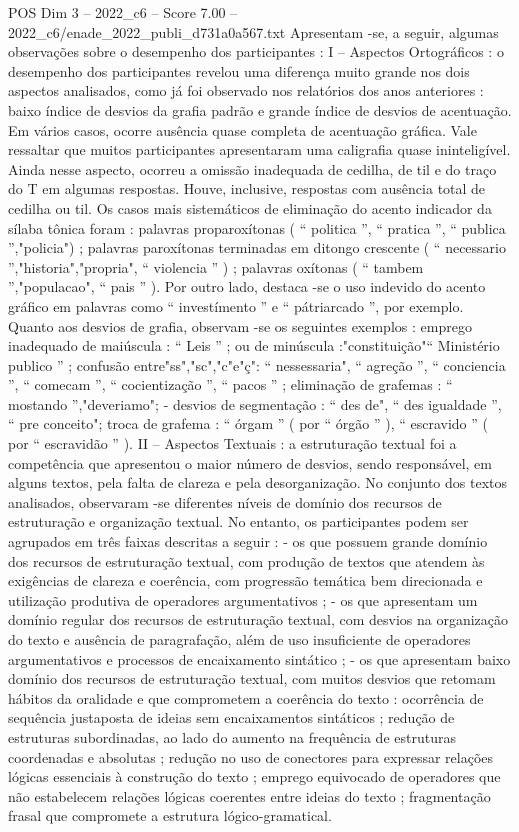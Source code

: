 \begin{textsample}{POS Dim 3 – 2022\_c6 – Score 7.00 – 2022\_c6/enade\_2022\_publi\_d731a0a567.txt}
Apresentam -se, a seguir, algumas observações sobre o desempenho dos participantes : I – Aspectos Ortográficos : o desempenho dos participantes revelou uma diferença muito grande nos dois aspectos analisados, como já foi observado nos relatórios dos anos anteriores : baixo índice de desvios da grafia padrão e grande índice de desvios de acentuação.
Em vários casos, ocorre ausência quase completa de acentuação gráfica.
Vale ressaltar que muitos participantes apresentaram uma caligrafia quase ininteligível.
Ainda nesse aspecto, ocorreu a omissão inadequada de cedilha, de til e do traço do T em algumas respostas.
Houve, inclusive, respostas com ausência total de cedilha ou til.
Os casos mais sistemáticos de eliminação do acento indicador da sílaba tônica foram : palavras proparoxítonas ( “ politica ”, “ pratica ”, “ publica ”,"policia") ; palavras paroxítonas terminadas em ditongo crescente ( “ necessario ”,"historia","propria", “ violencia ” ) ; palavras oxítonas ( “ tambem ”,"populacao", “ pais ” ).
Por outro lado, destaca -se o uso indevido do acento gráfico em palavras como “ investímento ” e “ pátriarcado ”, por exemplo.
Quanto aos desvios de grafia, observam -se os seguintes exemplos : emprego inadequado de maiúscula : “ Leis ” ; ou de minúscula :"constituição"“ Ministério publico ” ; confusão entre"ss","sc","c"e"ç": “ nessessaria", “ agreção ”, “ conciencia ”, “ comecam ”, “ cocientização ”, “ pacos ” ; eliminação de grafemas : “ mostando ”,"deveriamo"; - desvios de segmentação : “ des de", “ des igualdade ”, “ pre conceito"; troca de grafema : “ órgam ” ( por “ órgão ” ), “ escravido ” ( por “ escravidão ” ).
II – Aspectos Textuais : a estruturação textual foi a competência que apresentou o maior número de desvios, sendo responsável, em alguns textos, pela falta de clareza e pela desorganização.
No conjunto dos textos analisados, observaram -se diferentes níveis de domínio dos recursos de estruturação e organização textual.
No entanto, os participantes podem ser agrupados em três faixas descritas a seguir : - os que possuem grande domínio dos recursos de estruturação textual, com produção de textos que atendem às exigências de clareza e coerência, com progressão temática bem direcionada e utilização produtiva de operadores argumentativos ; - os que apresentam um domínio regular dos recursos de estruturação textual, com desvios na organização do texto e ausência de paragrafação, além de uso insuficiente de operadores argumentativos e processos de encaixamento sintático ; - os que apresentam baixo domínio dos recursos de estruturação textual, com muitos desvios que retomam hábitos da oralidade e que comprometem a coerência do texto : ocorrência de sequência justaposta de ideias sem encaixamentos sintáticos ; redução de estruturas subordinadas, ao lado do aumento na frequência de estruturas coordenadas e absolutas ; redução no uso de conectores para expressar relações lógicas essenciais à construção do texto ; emprego equivocado de operadores que não estabelecem relações lógicas coerentes entre ideias do texto ; fragmentação frasal que compromete a estrutura lógico-gramatical.

\end{textsample}
